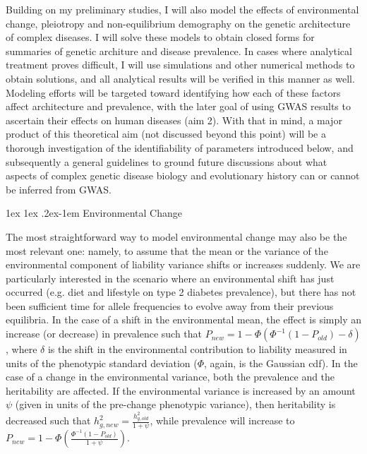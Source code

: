 \documentclass[11pt]{article}
\makeatletter
\renewcommand{\paragraph}{%
  \@startsection{paragraph}{4}%
  {\z@}{1ex \@plus 1ex \@minus .2ex}{-1em}%
  {\normalfont\normalsize\bfseries}%
}
\makeatother
\begin{document}
Building on my preliminary studies, I will also model the effects of environmental change, pleiotropy and non-equilibrium demography on the genetic architecture of complex diseases. I will solve these models to obtain closed forms for summaries of genetic architure and disease prevalence. In cases where analytical treatment proves difficult, I will use simulations and other numerical methods to obtain solutions, and all analytical results will be verified in this manner as well. Modeling efforts will be targeted toward identifying how each of these factors affect architecture and prevalence, with the later goal of using GWAS results to ascertain their effects on human diseases (aim 2). With that in mind, a major product of this theoretical aim (not discussed beyond this point) will be a thorough investigation of the identifiability of parameters introduced below, and subsequently a general guidelines to ground future discussions about what aspects of complex genetic disease biology and evolutionary history can or cannot be inferred from GWAS.

\paragraph{Environmental Change}
 
The most straightforward way to model environmental change may also be the most relevant one: namely, to assume that the mean or the variance of the environmental component of liability variance shifts or increases suddenly. We are particularly interested in the scenario where an environmental shift has just occurred (e.g. diet and lifestyle on type 2 diabetes prevalence), but there has not been sufficient time for allele frequencies to evolve away from their previous equilibria. In the case of a shift in the environmental mean, the effect is simply an increase (or decrease) in prevalence such that $P_{new} = 1 - \Phi\left(\Phi^{-1}\left(1-P_{old}\right)-\delta\right)$, where $\delta$ is the shift in the environmental contribution to liability measured in units of the phenotypic standard deviation ($\Phi$, again, is the Gaussian cdf). In the case of a change in the environmental variance, both the prevalence and the heritability are affected. If the environmental variance is increased by an amount $\psi$ (given in units of the pre-change phenotypic variance), then heritability is decreased such that $h^2_{g,new} = \frac{h^2_{g,old}}{1+\psi}$, while prevalence will increase to $P_{new} = 1 - \Phi\left(\frac{\Phi^{-1}\left(1-P_{old}\right)}{1+\psi}\right)$.
\end{document}

